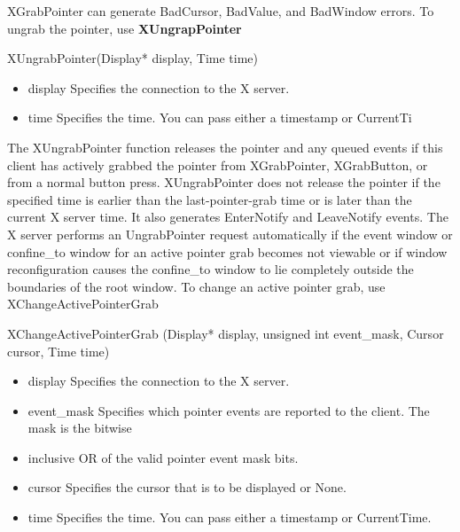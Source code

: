 \documentclass{report}
\begin{document}
\begin{itemize}
            \bigbreak \noindent 
            XGrabPointer can generate BadCursor, BadValue, and BadWindow errors.
            \bigbreak \noindent 
            To ungrab the pointer, use \textbf{XUngrapPointer}
            \bigbreak \noindent 
            \begin{cppcode}
                XUngrabPointer(Display* display, Time time)
            \end{cppcode}
            \begin{itemize}
                \item display Specifies the connection to the X server.
                \item time Specifies the time. You can pass either a timestamp or CurrentTi
            \end{itemize}
            The XUngrabPointer function releases the pointer and any queued events if this client has actively grabbed the pointer from XGrabPointer, XGrabButton, or from a normal button press. XUngrabPointer does not release the pointer if the specified time is earlier than the last-pointer-grab time or is later than the current X server time. It also generates EnterNotify and LeaveNotify events. The X server performs an UngrabPointer request automatically if the event window or confine\_to window for an active pointer grab becomes not viewable or if window reconfiguration causes the confine\_to window to lie completely outside the boundaries of the root window.
            \bigbreak \noindent 
            To change an active pointer grab, use XChangeActivePointerGrab
            \begin{cppcode}
                XChangeActivePointerGrab (Display* display, unsigned int event_mask, Cursor cursor, Time time)
            \end{cppcode}
            \begin{itemize}
                \item display Speciﬁes the connection to the X server.
                \item event\_mask Speciﬁes which pointer events are reported to the client. The mask is the bitwise
                \item inclusive OR of the valid pointer event mask bits.
                \item cursor Speciﬁes the cursor that is to be displayed or None.
                \item time Speciﬁes the time. You can pass either a timestamp or CurrentTime.
            \end{itemize}

\end{itemize}
\end{document}
